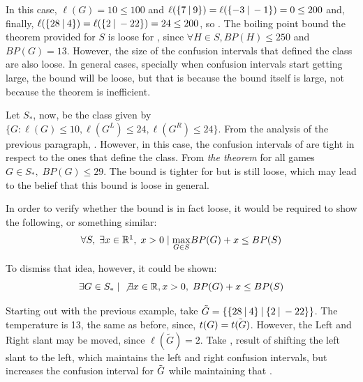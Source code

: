 In this case, $\ell(G) = 10 \leq 100$ and \mbox{$\ell(\mbox{$\{7\:|\:9\}$}) = \ell(\mbox{$\{-3\:|\:-1\}$}) = 0 \leq 200$} and, finally, \mbox{$\ell(\mbox{$\{28\:|\:4\}$}) = \ell(\mbox{$\{2\:|\:-22\}$}) = 24 \leq 200$}, so . The boiling point bound the theorem provided for $S$ is loose for \Gm{}, since $\forall H \in S, BP(H) \leq 250$ and $BP(G) = 13$. However, the size of the confusion intervals that defined the class are also loose. In general cases, specially when confusion intervals start getting large, the bound will be loose, but that is because the bound itself is large, not because the theorem is inefficient.

Let $S_*$, now, be the class given by $\{G : \ell(G)\leq10, \ell(G^L)\leq24, \ell(G^R)\leq24\}$. From the analysis of the previous paragraph, . However, in this case, the confusion intervals of \Gm{} are tight in respect to the ones that define the class. From \textit{the theorem} for all games $G \in S_*,\; BP(G) \leq 29$. The bound is tighter for \Gm{} but is still loose, which may lead to the belief that this bound is loose in general.

In order to verify whether the bound is in fact loose, it would be required to show the following, or something similar:
$$
\forall S,\;\exists x\in \mathbb{R}\footnotemark,\; x>0\;|\; \underset{G\in S}{\max}BP(G) + x \leq BP(S)
$$


To dismiss that idea, however, it could be shown:
$$
\exists G \in S_*\;|\;\not\exists x \in \mathbb{R}, x>0,\; BP(G) + x \leq BP(S)
$$

Starting out with the previous example, take $\tilde{G} = \mbox{$\{\mbox{$\{28\:|\:4\}$}\:|\:\mbox{$\{2\:|\:-22\}$}\}$}$. The temperature is 13, the same as before, since, $t(\mbox{$G$}) = \tilde{t(\mbox{$G$})}$. However, the Left and Right slant may be moved, since $\ell(\tilde{G}) = 2$. Take , result of shifting the left slant to the left, which maintains the left and right confusion intervals, but increases the confusion interval for $\tilde{\mbox{$G$}}$ while maintaining that .

